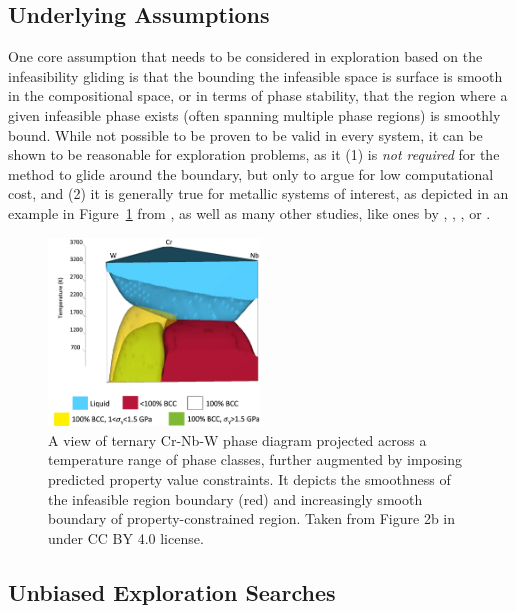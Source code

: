 \subsection{Underlying Assumptions} \label{infglide:ssec:assumptions}

One core assumption that needs to be considered in exploration based on the infeasibility gliding is that the bounding the infeasible space is surface is smooth in the compositional space, or in terms of phase stability, that the region where a given infeasible phase exists (often spanning multiple phase regions) is smoothly bound. While not possible to be proven to be valid in every system, it can be shown to be reasonable for exploration problems, as it (1) is \emph{not required} for the method to glide around the boundary, but only to argue for low computational cost, and (2) it is generally true for metallic systems of interest, as depicted in an example in Figure~\ref{infeasibilitygliding:fig:katesphasemap} from \citet{Elder2023ComputationalValidation}, as well as many other studies, like ones by \citet{Bobbio2022DesignCompositions}, \citet{Sun2024MaterialsMap:Ag-Al-Cu}, \citet{Gao2016SenaryHfNbTaTiVZr}, or \citet{Zhao2014ExperimentalSystem}.

\begin{figure}[H]
    \centering
    \includegraphics[width=0.5\textwidth]{infeasibilitygliding/PhaseTernaryMap_Elder2023.png}
    \caption{A view of ternary Cr-Nb-W phase diagram projected across a temperature range of phase classes, further augmented by imposing predicted property value constraints. It depicts the smoothness of the infeasible region boundary (red) and increasingly smooth boundary of property-constrained region. Taken from Figure 2b in \citet{Elder2023ComputationalValidation} under CC BY 4.0 license.}
    \label{infeasibilitygliding:fig:katesphasemap}
\end{figure}


\subsection{Unbiased Exploration Searches} \label{infglide:ssec:unbiasedexplore}

